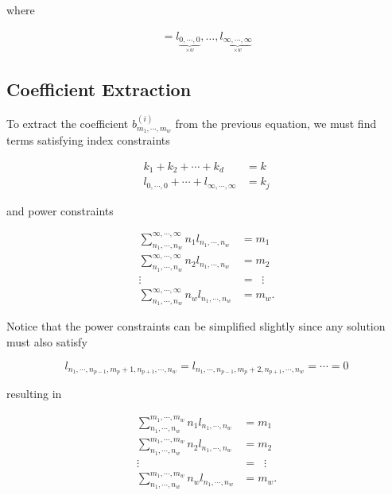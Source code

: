 \documentclass{article}
\begin{document}
\noindent
where

\begin{align*}
    [l] = l_{\underbrace{0, \cdots, 0}_{\times w}}, \ldots, l_{\underbrace{\infty, \cdots, \infty}_{\times w}}
\end{align*}

\subsection{Coefficient Extraction}

\noindent
To extract the coefficient $b^{(i)}_{m_1, \cdots, m_w}$ from the previous equation, we must find terms satisfying index constraints

\begin{align*}
    k_1 + k_2 + \cdots + k_d &= k \\
    l_{0, \cdots, 0} + \cdots + l_{\infty, \cdots, \infty} &= k_j
\end{align*}

\noindent
and power constraints

\begin{align*}
    \sum_{n_1, \cdots, n_w}^{\infty, \cdots, \infty} n_1 l_{n_1, \cdots, n_w} &= m_1 \\
    \sum_{n_1, \cdots, n_w}^{\infty, \cdots, \infty} n_2 l_{n_1, \cdots, n_w} &= m_2 \\
    \vdots \qquad &= \;\; \vdots \\
    \sum_{n_1, \cdots, n_w}^{\infty, \cdots, \infty} n_w l_{n_1, \cdots, n_w} &= m_w.
\end{align*}

\noindent
Notice that the power constraints can be simplified slightly since any solution must also satisfy

\begin{equation*}
    l_{n_1, \cdots, n_{p-1}, m_p + 1, n_{p+1}, \cdots, n_w} = l_{n_1, \cdots, n_{p-1}, m_p + 2, n_{p+1}, \cdots, n_w} = \cdots = 0
\end{equation*}

\noindent
resulting in

\begin{align*}
    \sum_{n_1, \cdots, n_w}^{m_1, \cdots, m_w} n_1 l_{n_1, \cdots, n_w} &= m_1 \\
    \sum_{n_1, \cdots, n_w}^{m_1, \cdots, m_w} n_2 l_{n_1, \cdots, n_w} &= m_2 \\
    \vdots \qquad &= \;\; \vdots \\
    \sum_{n_1, \cdots, n_w}^{m_1, \cdots, m_w} n_w l_{n_1, \cdots, n_w} &= m_w.
\end{align*}
\end{document}
